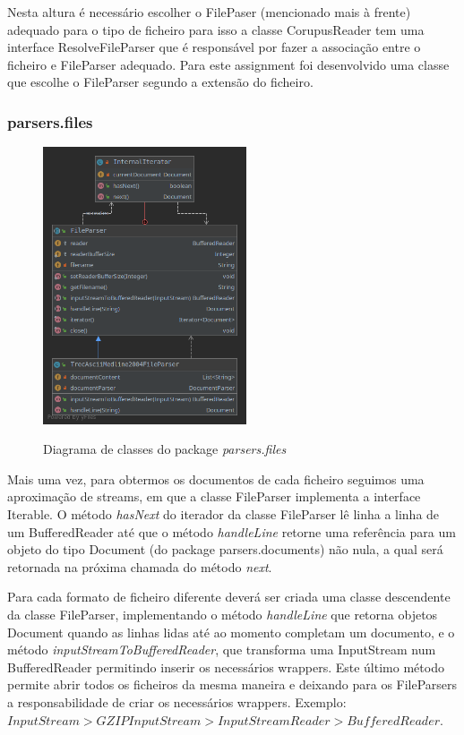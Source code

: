 \documentclass[12pt]{article}
\begin{document}
Nesta altura é necessário escolher o FilePaser (mencionado mais à frente) adequado para
o tipo de ficheiro para isso a classe CorupusReader tem uma interface ResolveFileParser
que é responsável por fazer a associação entre o ficheiro e FileParser adequado. Para este
assignment foi desenvolvido uma classe que escolhe o FileParser segundo a extensão do ficheiro.


\subsubsection{parsers.files}
\begin{figure}[h]
  \center
  \includegraphics[width=6cm]{packages_parsers_files.png}
  \label{fig:packages_parsers_files}
  \caption{Diagrama de classes do package \it parsers.files}
\end{figure}

Mais uma vez, para obtermos os documentos de cada ficheiro seguimos uma aproximação
de streams, em que a classe FileParser implementa a interface Iterable. O método
{\it hasNext} do iterador da classe FileParser lê linha a linha de um BufferedReader
até que o método {\it handleLine} retorne uma referência para um objeto do tipo Document
(do package parsers.documents) não nula, a qual será retornada na próxima chamada do
método {\it next}.

Para cada formato de ficheiro diferente deverá ser criada uma classe descendente da classe
FileParser, implementando o método {\it handleLine} que retorna objetos Document quando
as linhas lidas até ao momento completam um documento, e o método {\it inputStreamToBufferedReader},
que transforma uma InputStream num BufferedReader permitindo inserir os necessários wrappers.
Este último método permite abrir todos os ficheiros da mesma maneira e deixando para os FileParsers
a responsabilidade de criar os necessários wrappers. Exemplo: \(InputStream >
GZIPInputStream > InputStreamReader > BufferedReader\).
\end{document}
